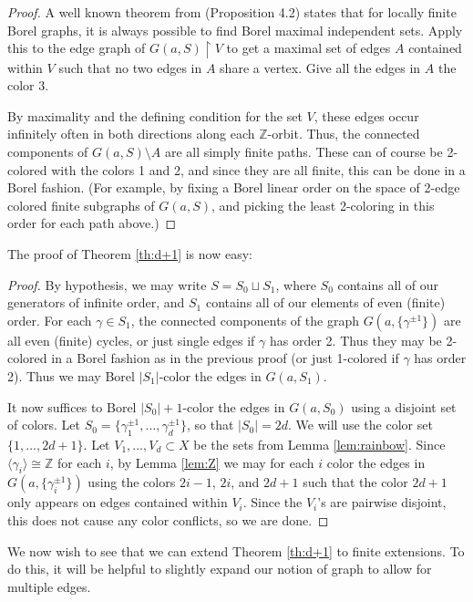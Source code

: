 \documentclass[10pt,a4paper]{article}
\newcommand{\0}{\varnothing}
\newcommand{\Z}{\mathbb{Z}}
\newcommand{\res}{\upharpoonright}
\begin{document}
\begin{proof}
A well known theorem from \cite{KST} (Proposition 4.2) states that for locally finite Borel graphs, it is always possible to find Borel maximal independent sets. Apply this to the edge graph of $G(a,S) \res V$ to get a maximal set of edges $A$ contained within $V$ such that no two edges in $A$ share a vertex. Give all the edges in $A$ the color 3.

By maximality and the defining condition for the set $V$, these edges occur infinitely often in both directions along each $\Z$-orbit. Thus, the connected components of $G(a,S) \setminus A$ are all simply finite paths. These can of course be 2-colored with the colors 1 and 2, and since they are all finite, this can be done in a Borel fashion. (For example, by fixing a Borel linear order on the space of 2-edge colored finite subgraphs of $G(a,S)$, and picking the least 2-coloring in this order for each path above.)
\end{proof}

The proof of Theorem \ref{th:d+1} is now easy:

\begin{proof}
By hypothesis, we may write $S = S_0 \sqcup S_1$, where $S_0$ contains all of our generators of infinite order, and $S_1$ contains all of our elements of even (finite) order. For each $\gamma \in S_1$, the connected components of the graph $G(a,\{\gamma^{\pm 1} \})$ are all even (finite) cycles, or just single edges if $\gamma$ has order 2. Thus they may be 2-colored in a Borel fashion as in the previous proof (or just 1-colored if $\gamma$ has order 2). Thus we may Borel $|S_1|$-color the edges in $G(a,S_1)$.

It now suffices to Borel $|S_0|+1$-color the edges in $G(a,S_0)$ using a disjoint set of colors. Let $S_0 = \{\gamma_1^{\pm 1},\ldots,\gamma_d^{\pm 1}\}$, so that $|S_0| = 2d$. We will use the color set $\{1,\ldots,2d+1\}$. Let $V_1,\ldots,V_d \subset X$ be the sets from Lemma \ref{lem:rainbow}. Since $\langle \gamma_i \rangle \cong \Z$ for each $i$, by Lemma \ref{lem:Z} we may for each $i$ color the edges in $G(a,\{ \gamma_i^{\pm 1} \})$ using the colors $2i-1$, $2i$, and $2d+1$ such that the color $2d+1$ only appears on edges contained within $V_i$. Since the $V_i$'s are pairwise disjoint, this does not cause any color conflicts, so we are done.
\end{proof}

We now wish to see that we can extend Theorem \ref{th:d+1} to finite extensions. To do this, it will be helpful to slightly expand our notion of graph to allow for multiple edges.
\end{document}
